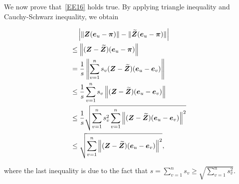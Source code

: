 \documentclass[journal]{IEEEtran}
\begin{document}
\begin{IEEEproof}
    We now prove that~\eqref{EE16} holds true.  By applying triangle inequality and Cauchy-Schwarz inequality, we obtain
    \begin{small}
        \begin{align*}
             & \quad \left|\left\Vert\boldsymbol{Z}(\boldsymbol{e}_u-\boldsymbol{\pi})\right\Vert-\|\widetilde{\boldsymbol{Z}}(\boldsymbol{e}_u-\boldsymbol{\pi})\| \right|                                 \\
             & \le \left\Vert(\boldsymbol{Z}-\widetilde{\boldsymbol{Z}})(\boldsymbol{e}_u-\boldsymbol{\pi})\right\Vert                                                           \\
             & = \frac{1}{s} \left\Vert\sum_{v=1}^{n} s_v (\boldsymbol{Z}-\widetilde{\boldsymbol{Z}})(\boldsymbol{e}_u-\boldsymbol{e}_v)\right\Vert                             \\
             & \le \frac{1}{s} \sum_{v=1}^{n} s_v \left\Vert(\boldsymbol{Z}-\widetilde{\boldsymbol{Z}})(\boldsymbol{e}_u-\boldsymbol{e}_v)\right\Vert                           \\
             & \le \frac{1}{s} \sqrt{\sum_{v=1}^{n} s_v^2 \sum_{v=1}^{n} \left\Vert(\boldsymbol{Z}-\widetilde{\boldsymbol{Z}})(\boldsymbol{e}_u-\boldsymbol{e}_v)\right\Vert^2} \\
             & \le \sqrt{\sum_{v=1}^{n} \left\Vert(\boldsymbol{Z}-\widetilde{\boldsymbol{Z}})(\boldsymbol{e}_u-\boldsymbol{e}_v)\right\Vert^2},
        \end{align*}
    \end{small}
    where the last inequality is due to the fact that \(s=\sum_{v=1}^{n} s_v\ge \sqrt{\sum_{v=1}^{n} s_v^2}\).


\end{IEEEproof}
\end{document}
